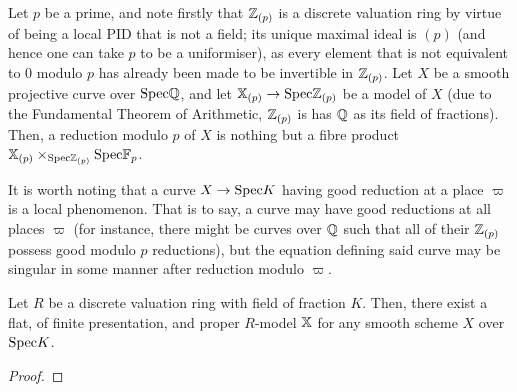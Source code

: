                     \begin{example}
                        Let $p$ be a prime, and note firstly that $\mathbb{Z}_{(p)}$ is a discrete valuation ring by virtue of being a local PID that is not a field; its unique maximal ideal is $(p)$ (and hence one can take $p$ to be a uniformiser), as every element that is not equivalent to $0$ modulo $p$ has already been made to be invertible in $\mathbb{Z}_{(p)}$. Let $X$ be a smooth projective curve over $\mathrm{Spec} \mathbb{Q}$, and let $\mathbb{X}_{(p)} \to \mathrm{Spec} \mathbb{Z}_{(p)}$ be a model of $X$ (due to the Fundamental Theorem of Arithmetic, $\mathbb{Z}_{(p)}$ is has $\mathbb{Q}$ as its field of fractions). Then, a reduction modulo $p$ of $X$ is nothing but a fibre product $\bbX_{(p)} \x_{\Spec \Z_{(p)}} \Spec \F_p$. 
                    \end{example}
                    \begin{remark}
                        It is worth noting that a curve $X \to \mathrm{Spec} K$ having good reduction at a place $\varpi$ is a local phenomenon. That is to say, a curve may have good reductions at all places $\varpi$ (for instance, there might be curves over $\mathbb{Q}$ such that all of their $\mathbb{Z}_{(p)}$ possess good modulo $p$ reductions), but the equation defining said curve may be singular in some manner after reduction modulo $\varpi$. 
                    \end{remark}
                    
                    \begin{lemma}
                        Let $R$ be a discrete valuation ring with field of fraction $K$. Then, there exist a flat, of finite presentation, and proper $R$-model $\mathbb{X}$ for any smooth scheme $X$ over $\mathrm{Spec} K$.
                    \end{lemma}
                        \begin{proof}
                            
                        \end{proof}
                    

